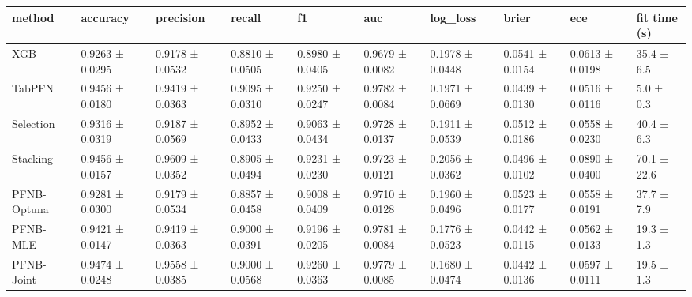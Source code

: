 \begin{tabular}{llllllllll}
\toprule
method & accuracy & precision & recall & f1 & auc & log\_loss & brier & ece & fit time (s) \\
\midrule
XGB & 0.9263 ± 0.0295 & 0.9178 ± 0.0532 & 0.8810 ± 0.0505 & 0.8980 ± 0.0405 & 0.9679 ± 0.0082 & 0.1978 ± 0.0448 & 0.0541 ± 0.0154 & 0.0613 ± 0.0198 & 35.4 ± 6.5 \\
TabPFN & 0.9456 ± 0.0180 & 0.9419 ± 0.0363 & 0.9095 ± 0.0310 & 0.9250 ± 0.0247 & 0.9782 ± 0.0084 & 0.1971 ± 0.0669 & 0.0439 ± 0.0130 & 0.0516 ± 0.0116 & 5.0 ± 0.3 \\
Selection & 0.9316 ± 0.0319 & 0.9187 ± 0.0569 & 0.8952 ± 0.0433 & 0.9063 ± 0.0434 & 0.9728 ± 0.0137 & 0.1911 ± 0.0539 & 0.0512 ± 0.0186 & 0.0558 ± 0.0230 & 40.4 ± 6.3 \\
Stacking & 0.9456 ± 0.0157 & 0.9609 ± 0.0352 & 0.8905 ± 0.0494 & 0.9231 ± 0.0230 & 0.9723 ± 0.0121 & 0.2056 ± 0.0362 & 0.0496 ± 0.0102 & 0.0890 ± 0.0400 & 70.1 ± 22.6 \\
PFNB-Optuna & 0.9281 ± 0.0300 & 0.9179 ± 0.0534 & 0.8857 ± 0.0458 & 0.9008 ± 0.0409 & 0.9710 ± 0.0128 & 0.1960 ± 0.0496 & 0.0523 ± 0.0177 & 0.0558 ± 0.0191 & 37.7 ± 7.9 \\
PFNB-MLE & 0.9421 ± 0.0147 & 0.9419 ± 0.0363 & 0.9000 ± 0.0391 & 0.9196 ± 0.0205 & 0.9781 ± 0.0084 & 0.1776 ± 0.0523 & 0.0442 ± 0.0115 & 0.0562 ± 0.0133 & 19.3 ± 1.3 \\
PFNB-Joint & 0.9474 ± 0.0248 & 0.9558 ± 0.0385 & 0.9000 ± 0.0568 & 0.9260 ± 0.0363 & 0.9779 ± 0.0085 & 0.1680 ± 0.0474 & 0.0442 ± 0.0136 & 0.0597 ± 0.0111 & 19.5 ± 1.3 \\
\bottomrule
\end{tabular}
